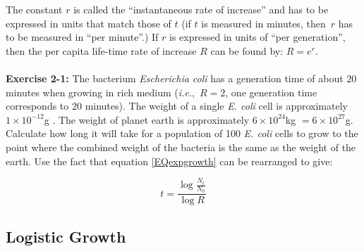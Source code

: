 \documentclass[11pt,a4paper]{book}
\newcommand{\ie}{\emph{i.e.},\ }
\begin{document}
The constant $r$ is called the ``instantaneous rate of increase'' and has to be expressed in units that match those of $t$ (if $t$ is measured in minutes, then~$r$ has to be measured in ``per minute''.) If $r$ is expressed in units of ``per generation'', then the per capita life-time rate of increase $R$ can be found by: $R=e^r$.\\
\\

{\bf Exercise 2-1: }
The bacterium \emph{Escherichia coli} has a generation time of about $20$ minutes when growing in rich medium (\ie $R=2$, one generation time corresponds to $20$ minutes). The weight of a single \emph{E. coli} cell is approximately $1\times 10^{-12}$g . The weight of planet earth is approximately $6 \times 10^{24}$kg $= 6\times 10^{27}$g. Calculate how long it will take for a population of 100 \emph{E. coli}  cells to grow to the point where the combined weight of the bacteria is the same as the weight of the earth. Use the fact that equation  \ref{EQexpgrowth} can be rearranged to give:

\begin{equation*}
t = \frac{\log{\tfrac{N_t}{N_0}}}{\log{R}} \label{texp}
\end{equation*}



\subsection{Logistic Growth}
\end{document}
